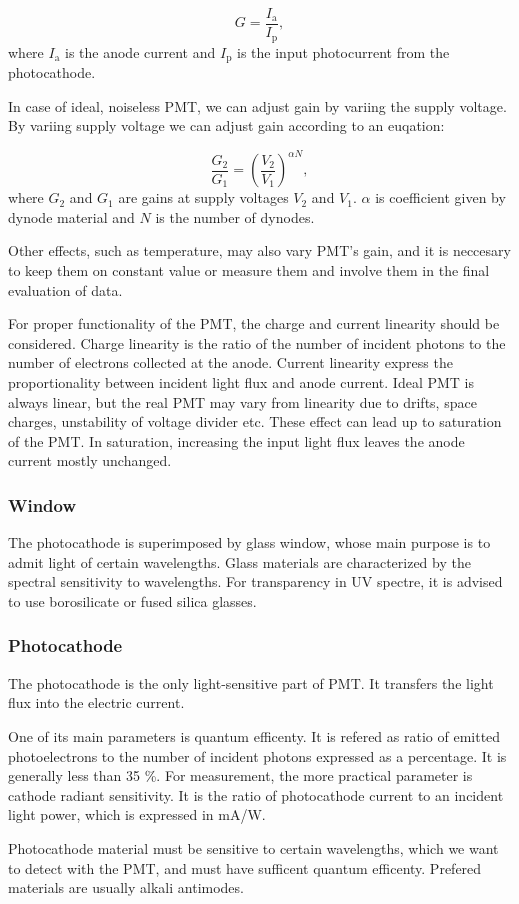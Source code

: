 \begin{equation}
G = \frac{I_\textrm{a}}{I_\textrm{p}},
\end{equation}
where $I_\textrm{a}$ is the anode current and $I_\textrm{p}$ is the input photocurrent from the photocathode.
\par
In case of ideal, noiseless PMT, we can adjust gain by variing the supply voltage. By variing supply voltage we can adjust gain according to an euqation:

\begin{equation}
\frac{G_2}{G_1} = (\frac{V_2}{V_1})^{\alpha N},
\end{equation}
where $G_2$ and $G_1$ are gains at supply voltages $V_2$ and $V_1$. $\alpha$ is coefficient given by dynode material and $N$ is the number of dynodes.
\par
Other effects, such as temperature, may also vary PMT's gain, and it is neccesary to keep them on constant value or measure them and involve them in the final evaluation of data.
\par
For proper functionality of the PMT, the charge and current linearity should be considered. Charge linearity is the ratio of the number of incident photons to the number of electrons collected at the anode. Current linearity express the proportionality between incident light flux and anode current. Ideal PMT is always linear, but the real PMT may vary from linearity due to drifts, space charges, unstability of voltage divider etc. These effect can lead up to saturation of the PMT. In saturation, increasing the input light flux leaves the anode current mostly unchanged.      


\subsubsection{Window}

The photocathode is superimposed by glass window, whose main purpose is to admit light of certain wavelengths. Glass materials are characterized by the spectral sensitivity to wavelengths. For transparency in UV spectre, it is advised to use borosilicate or fused silica glasses.


\subsubsection{Photocathode}

The photocathode is the only light-sensitive part of PMT. It transfers the light flux into the electric current.
\par
One of its main parameters is quantum efficenty. It is refered as ratio of emitted photoelectrons to the number of incident photons expressed as a percentage. It is generally less than 35 \%. For measurement, the more practical parameter is cathode radiant sensitivity. It is the ratio of photocathode current to an incident light power, which is expressed in mA/W.
\par
Photocathode material must be sensitive to certain wavelengths, which we want to detect with the PMT, and must have sufficent quantum efficenty. Prefered materials are usually alkali antimodes.
